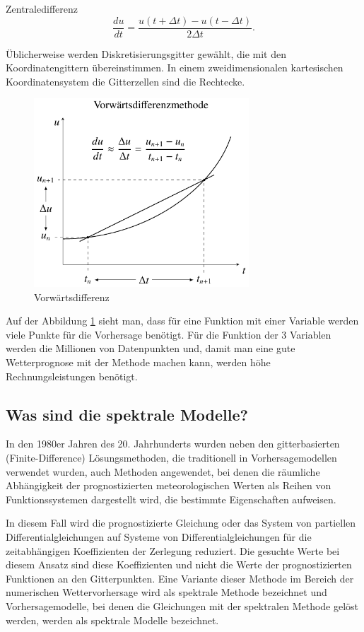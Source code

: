 Zentraledifferenz
\begin{equation}
\frac{du}{dt} = \frac{u(t + \Delta{t}) - u(t - \Delta{t})}{2\Delta{t}}.
\label{spektral:equation3}
\end{equation}

Üblicherweise werden Diskretisierungsgitter gewählt, die mit den Koordinatengittern übereinstimmen.
In einem zweidimensionalen kartesischen Koordinatensystem die Gitterzellen sind die Rechtecke.
\pagebreak
\begin{figure}[h]
	\centering
	\includegraphics[height=200pt]{papers/spektral/images/forward_difference.pdf}
	\caption{Vorwärtsdifferenz}
    \label{spektral:fig:gittermodelle}
\end{figure}

Auf der Abbildung \ref{spektral:fig:gittermodelle} sieht man, dass für eine Funktion mit einer Variable werden viele Punkte für die Vorhersage benötigt. Für die Funktion der 3 Variablen werden die Millionen von Datenpunkten und, damit man eine gute Wetterprognose mit der Methode machen kann, werden höhe Rechnungsleistungen benötigt.

\subsection{Was sind die spektrale Modelle?
\label{spektral:subsection:spektralemodelle}}
In den 1980er Jahren des 20. Jahrhunderts wurden neben den gitterbasierten (Finite-Difference) Lösungsmethoden, die traditionell in Vorhersagemodellen verwendet wurden, auch Methoden angewendet, bei denen die räumliche Abhängigkeit der prognostizierten meteorologischen Werten als Reihen von Funktionssystemen dargestellt wird, die bestimmte Eigenschaften aufweisen.

In diesem Fall wird die prognostizierte Gleichung oder das System von partiellen Differentialgleichungen auf Systeme von Differentialgleichungen für die zeitabhängigen Koeffizienten der Zerlegung reduziert.
Die gesuchte Werte bei diesem Ansatz sind diese Koeffizienten und nicht die Werte der prognostizierten Funktionen an den Gitterpunkten. 
Eine Variante dieser Methode im Bereich der numerischen Wettervorhersage wird als spektrale Methode bezeichnet und Vorhersagemodelle, bei denen die Gleichungen mit der spektralen Methode gelöst werden, werden als spektrale Modelle bezeichnet.

